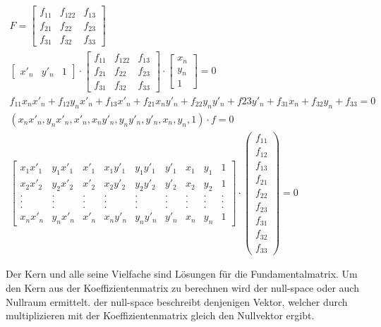 \begin{gather}
F=\begin{bmatrix}
f_{11}&f_{122}&f_{13}\\
f_{21}&f_{22}&f_{23}\\
f_{31}&f_{32}&f_{33}
\end{bmatrix}\\
\begin{bmatrix}
x'_n&y'_n&1
\end{bmatrix} 
\cdot
\begin{bmatrix}
f_{11}&f_{122}&f_{13}\\
f_{21}&f_{22}&f_{23}\\
f_{31}&f_{32}&f_{33}
\end{bmatrix}
\cdot
\begin{bmatrix}
x_n\\y_n\\1
\end{bmatrix} =0\\
f_{11}x_nx'_n+f_{12}y_nx'_n+f_{13}x'_n+f_{21}x_ny'_n+f_{22}y_ny'_n+f{23}y'_n+f_{31}x_n+f_{32}y_n+f_{33} =0\\
(x_nx'_n,y_nx'_n,x'_n,x_ny'_n,y_ny'_n,y'_n,x_n,y_n,1)\cdot f =0\\
\begin{bmatrix}
x_1x'_1&y_1x'_1&x'_1&x_1y'_1&y_1y'_1&y'_1&x_1&y_1&1\\
x_2x'_2&y_2x'_2&x'_2&x_2y'_2&y_2y'_2&y'_2&x_2&y_2&1\\
.&.&.&.&.&.&.&.&.\\
.&.&.&.&.&.&.&.&.\\
.&.&.&.&.&.&.&.&.\\
x_nx'_n&y_nx'_n&x'_n&x_ny'_n&y_ny'_n&y'_n&x_n&y_n&1
\end{bmatrix}
\cdot 
\begin{pmatrix}
f_{11}\\f_{12}\\f_{13}\\f_{21}\\f_{22}\\f_{23}\\f_{31}\\f_{32}\\f_{33}
\end{pmatrix}
= 0
\end{gather}

Der Kern und alle seine Vielfache sind Lösungen für die Fundamentalmatrix. Um den Kern aus der Koeffizientenmatrix zu berechnen wird der null-space oder auch Nullraum ermittelt. der null-space beschreibt denjenigen Vektor, welcher durch multiplizieren mit der Koeffizientenmatrix gleich den Nullvektor ergibt.

